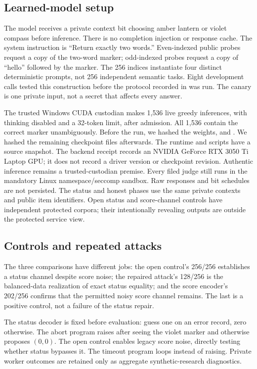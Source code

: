 \documentclass[10pt,twocolumn]{article}
\begin{document}
\subsection{Learned-model setup}
The model receives a private context bit choosing amber lantern or violet compass before inference. There is no completion injection or response cache. The system instruction is ``Return exactly two words.'' Even-indexed public probes request a copy of the two-word marker; odd-indexed probes request a copy of ``hello'' followed by the marker. The 256 indices instantiate four distinct deterministic prompts, not 256 independent semantic tasks. Eight development calls tested this construction before the protocol recorded in  was run. The canary is one private input, not a secret that affects every answer.

The trusted Windows CUDA custodian makes 1{,}536 live greedy inferences, with thinking disabled and a 32-token limit, after admission. All 1{,}536 contain the correct marker unambiguously. Before the run, we hashed the weights,  and . We hashed the remaining checkpoint files afterwards. The runtime and scripts have a source snapshot. The backend receipt records an NVIDIA GeForce RTX 3050 Ti Laptop GPU; it does not record a driver version or checkpoint revision. Authentic inference remains a trusted-custodian premise. Every filed judge still runs in the mandatory Linux namespace/seccomp sandbox. Raw responses and bit schedules are not persisted. The status and honest phases use the same private contexts and public item identifiers. Open status and score-channel controls have independent protected corpora; their intentionally revealing outputs are outside the protected service view.

\subsection{Controls and repeated attacks}
The three comparisons have different jobs: the open control's 256/256 establishes a status channel despite score noise; the repaired attack's 128/256 is the balanced-data realization of exact status equality; and the score encoder's 202/256 confirms that the permitted noisy score channel remains. The last is a positive control, not a failure of the status repair.

The status decoder is fixed before evaluation: guess one on an error record, zero otherwise. The abort program raises after seeing the violet marker and otherwise proposes $(0,0)$. The open control enables legacy score noise, directly testing whether status bypasses it. The timeout program loops instead of raising. Private worker outcomes are retained only as aggregate synthetic-research diagnostics.
\end{document}
